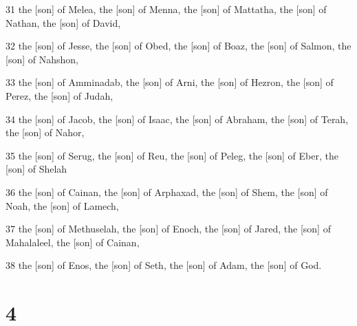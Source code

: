 \par 31 the [son] of Melea, the [son] of Menna, the [son] of Mattatha, the [son] of Nathan, the [son] of David,
\par 32 the [son] of Jesse, the [son] of Obed, the [son] of Boaz, the [son] of Salmon, the [son] of Nahshon,
\par 33 the [son] of Amminadab, the [son] of Arni, the [son] of Hezron, the [son] of Perez, the [son] of Judah,
\par 34 the [son] of Jacob, the [son] of Isaac, the [son] of Abraham, the [son] of Terah, the [son] of Nahor,
\par 35 the [son] of Serug, the [son] of Reu, the [son] of Peleg, the [son] of Eber, the [son] of Shelah
\par 36 the [son] of Cainan, the [son] of Arphaxad, the [son] of Shem, the [son] of Noah, the [son] of Lamech,
\par 37 the [son] of Methuselah, the [son] of Enoch, the [son] of Jared, the [son] of Mahalaleel, the [son] of Cainan,
\par 38 the [son] of Enos, the [son] of Seth, the [son] of Adam, the [son] of God.

\chapter{4}

